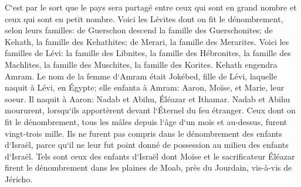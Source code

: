 \verse C`est par le sort que le pays sera partagé entre ceux qui sont en grand nombre et ceux qui sont en petit nombre. 
\verse Voici les Lévites dont on fit le dénombrement, selon leurs familles: de Guerschon descend la famille des Guerschonites; de Kehath, la famille des Kehathites; de Merari, la famille des Merarites. 
\verse Voici les familles de Lévi: la famille des Libnites, la famille des Hébronites, la famille des Machlites, la famille des Muschites, la famille des Korites. Kehath engendra Amram. 
\verse Le nom de la femme d`Amram était Jokébed, fille de Lévi, laquelle naquit à Lévi, en Égypte; elle enfanta à Amram: Aaron, Moïse, et Marie, leur soeur. 
\verse Il naquit à Aaron: Nadab et Abihu, Éléazar et Ithamar. 
\verse Nadab et Abihu moururent, lorsqu`ils apportèrent devant l`Éternel du feu étranger. 
\verse Ceux dont on fit le dénombrement, tous les mâles depuis l`âge d`un mois et au-dessus, furent vingt-trois mille. Ils ne furent pas compris dans le dénombrement des enfants d`Israël, parce qu`il ne leur fut point donné de possession au milieu des enfants d`Israël. 
\verse Tels sont ceux des enfants d`Israël dont Moïse et le sacrificateur Éléazar firent le dénombrement dans les plaines de Moab, près du Jourdain, vis-à-vis de Jéricho. 
